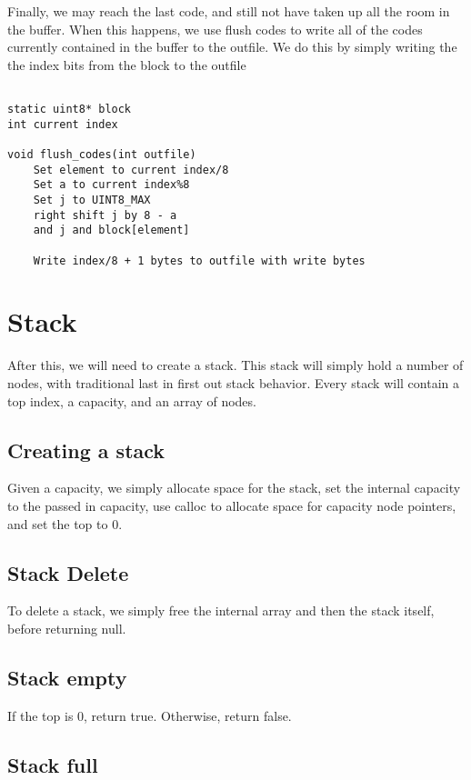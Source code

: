 \documentclass[11pt]{article}
\begin{document}
Finally, we may reach the last code, and still not have taken up all the room in the buffer. When this happens, we use flush codes to write all of the codes currently contained in the buffer to the outfile. We do this by simply writing the the index bits from the block to the outfile

\begin{verbatim}

static uint8* block
int current index

void flush_codes(int outfile)
    Set element to current index/8
    Set a to current index%8
    Set j to UINT8_MAX
    right shift j by 8 - a
    and j and block[element]

    Write index/8 + 1 bytes to outfile with write bytes

\end{verbatim}

\section{Stack}

After this, we will need to create a stack. This stack will simply hold a number of nodes, with traditional last in first out stack behavior. Every stack will contain a top index, a capacity, and an array of nodes.

\subsection{Creating a stack}

Given a capacity, we simply allocate space for the stack, set the internal capacity to the passed in capacity, use calloc to allocate space for capacity node pointers, and set the top to 0.

\subsection{Stack Delete}

To delete a stack, we simply free the internal array and then the stack itself, before returning null.

\subsection{Stack empty}

If the top is 0, return true. Otherwise, return false.

\subsection{Stack full}
\end{document}
